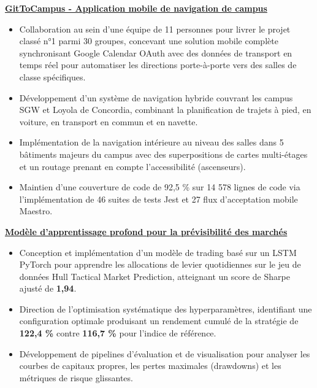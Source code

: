 \documentclass[10pt]{article}
\begin{document}
\href{https://github.com/LamdaDev/GitToCampus}{\textbf{GitToCampus - Application mobile de navigation de campus}}
\vspace{-4mm}
\begin{itemize}[left=0.15in, itemsep=0pt, label=--]
    \item Collaboration au sein d'une équipe de 11 personnes pour livrer le projet classé n°1 parmi 30 groupes, concevant une solution mobile complète synchronisant Google Calendar OAuth avec des données de transport en temps réel pour automatiser les directions porte-à-porte vers des salles de classe spécifiques.
    \item Développement d'un système de navigation hybride couvrant les campus SGW et Loyola de Concordia, combinant la planification de trajets à pied, en voiture, en transport en commun et en navette.
    \item Implémentation de la navigation intérieure au niveau des salles dans 5 bâtiments majeurs du campus avec des superpositions de cartes multi-étages et un routage prenant en compte l'accessibilité (ascenseurs).
    \item Maintien d'une couverture de code de 92,5 \% sur 14 578 lignes de code via l'implémentation de 46 suites de tests Jest et 27 flux d'acceptation mobile Maestro.
\end{itemize}

\href{https://github.com/Extinctable/COMP-433}{\textbf{Modèle d'apprentissage profond pour la prévisibilité des marchés}}
\vspace{-4mm}
\begin{itemize}[left=0.15in, itemsep=0pt, label=--]
    \item Conception et implémentation d'un modèle de trading basé sur un LSTM PyTorch pour apprendre les allocations de levier quotidiennes sur le jeu de données Hull Tactical Market Prediction, atteignant un score de Sharpe ajusté de \textbf{1,94}.
    \item Direction de l'optimisation systématique des hyperparamètres, identifiant une configuration optimale produisant un rendement cumulé de la stratégie de \textbf{122,4 \%} contre \textbf{116,7 \%} pour l'indice de référence.
    \item Développement de pipelines d'évaluation et de visualisation pour analyser les courbes de capitaux propres, les pertes maximales (drawdowns) et les métriques de risque glissantes.
\end{itemize}
\end{document}
